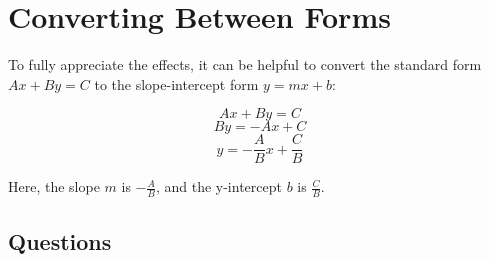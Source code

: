 \documentclass[12pt]{article}
\begin{document}
\newpage

\section*{Converting Between Forms}

To fully appreciate the effects, it can be helpful to convert the standard form \(Ax + By = C\) to the slope-intercept form \(y = mx + b\):

\[
Ax + By = C
\]
\[
By = -Ax + C
\]
\[
y = -\frac{A}{B}x + \frac{C}{B}
\]

Here, the slope \(m\) is \(-\frac{A}{B}\), and the y-intercept \(b\) is \(\frac{C}{B}\).

\subsection*{Questions}
\end{document}
